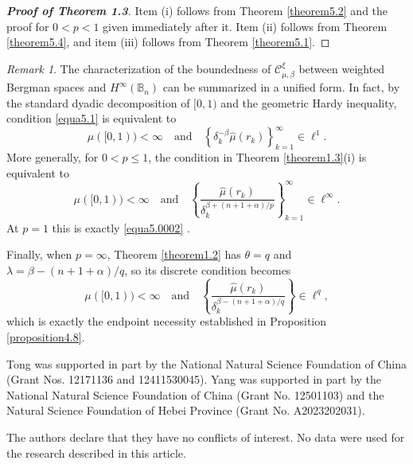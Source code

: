 \documentclass[preprint,12pt,times]{elsarticle}
\theoremstyle{definition}
\theoremstyle{remark}
\newtheorem{remark}[theorem]{Remark}
\numberwithin{equation}{section}
\begin{document}
\begin{proof}[{\bf Proof of Theorem 1.3}]
{Item (i) follows from Theorem \ref{theorem5.2} and the proof for
$0<p<1$ given immediately after it. Item (ii) follows from Theorem
\ref{theorem5.4}, and item (iii) follows from Theorem \ref{theorem5.1}.}
\end{proof}

\begin{remark}
The characterization of the boundedness of $\mathcal{C}_{\mu,\beta}^{\xi}$ between weighted Bergman spaces and $H^{\infty}(\mathbb{B}_n)$ can be summarized in a unified form. In fact, by the standard dyadic decomposition of $[0,1)$ and the geometric Hardy inequality, condition \eqref{equa5.1} is equivalent to 
\[
    \mu([0,1))<\infty
    \quad\text{and}\quad
    \left\{\delta_k^{-\beta}\hat{\mu}(r_k)\right\}_{k=1}^{\infty}\in \ell^1.
\]
  More generally, for $0<p\leq1$, the condition in Theorem
\ref{theorem1.3}(i)  is equivalent to
\[
    \mu([0,1))<\infty
    \quad\text{and}\quad
    \left\{\frac{\hat{\mu}(r_k)}{\delta_k^{\beta+(n+1+\alpha)/p}}\right\}_{k=1}^{\infty}\in \ell^{\infty}.
\]
  At  $p=1$  this is exactly \eqref{equa5.0002} .

{Finally, when $p=\infty$, Theorem \ref{theorem1.2} has
$\theta=q$ and $\lambda=\beta-(n+1+\alpha)/q$, so its discrete condition becomes
\[
    \mu([0,1))<\infty
    \quad\text{and}\quad
    \left\{\frac{\hat{\mu}(r_k)}{\delta_k^{\beta-(n+1+\alpha)/q}}\right\}\in \ell^q,
\]
which is exactly the endpoint necessity established in Proposition \ref{proposition4.8}.}
\end{remark}



Tong was supported in part by the National Natural Science Foundation of China (Grant Nos. 12171136 and 12411530045). Yang was supported in part by the National Natural Science Foundation of China (Grant No. 12501103) and the Natural Science Foundation of Hebei Province (Grant No. A2023202031).

The authors declare that they have no conflicts of interest. No data were used for the research described in this article. 
\end{document}
